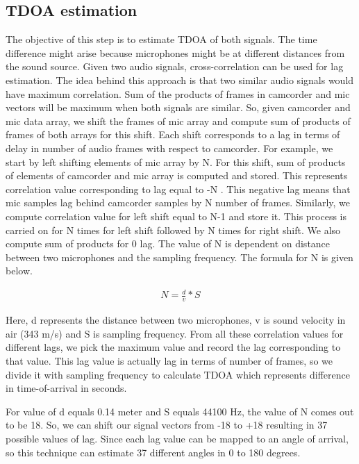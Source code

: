 \subsection{TDOA estimation}
The objective of this step is to estimate TDOA of both signals. The time difference might arise because microphones might be at different distances from the sound source. Given two audio signals,   cross-correlation can be used for lag estimation. The idea behind this approach is that two similar audio signals would have maximum correlation. Sum of the products of frames in camcorder and mic vectors will be maximum when both signals are similar. So, given camcorder and mic data array, we shift the frames of mic array and compute sum of products of frames of both arrays for this shift. Each shift corresponds to a lag in terms of delay in number of audio frames with respect to camcorder. For example, we start by left shifting elements of mic array by N. For this shift, sum of products of elements of camcorder and mic array is computed and  stored. This represents correlation value corresponding to lag equal to -N . This negative lag means that mic samples lag behind camcorder samples by N number of frames. Similarly, we compute correlation value for left shift equal to N-1 and store it. This process is carried on for N times for left shift followed by N times for right shift. We also compute sum of products for 0 lag. The value of N is dependent on distance between two microphones and the sampling frequency. The formula for N is given below.

\begin{gather*}
N =  \frac{d} {v} *S
\end{gather*}

Here, d represents the distance between two microphones, v is sound velocity in air (343 m/s) and S is sampling frequency. From all these correlation values for different lags, we pick the maximum value and record the lag corresponding to that value. This lag value is actually lag in terms of number of frames, so we divide it with sampling frequency to calculate TDOA which represents difference in time-of-arrival in seconds.

For value of d equals 0.14 meter and S equals 44100 Hz, the value of N comes out to be 18. So, we can shift our signal vectors from -18 to +18 resulting in 37 possible values of lag. Since each lag value can be mapped to an angle of arrival, so this technique can estimate 37 different angles in 0 to 180 degrees.


